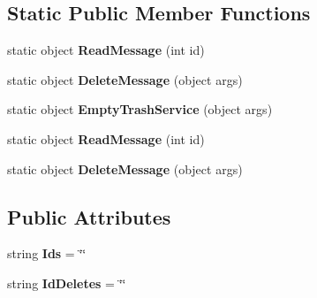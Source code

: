 \subsection*{Static Public Member Functions}
\begin{DoxyCompactItemize}
\item 
\hypertarget{classusertrash_a00e6164755aaf3a6714c8a7c9334a9fc}{static object {\bfseries Read\-Message} (int id)}\label{classusertrash_a00e6164755aaf3a6714c8a7c9334a9fc}

\item 
\hypertarget{classusertrash_a59f65d884c2452d7e72dea81f84ef089}{static object {\bfseries Delete\-Message} (object args)}\label{classusertrash_a59f65d884c2452d7e72dea81f84ef089}

\item 
\hypertarget{classusertrash_a010968e5218d0b8baf285c406c45ac39}{static object {\bfseries Empty\-Trash\-Service} (object args)}\label{classusertrash_a010968e5218d0b8baf285c406c45ac39}

\item 
\hypertarget{classusertrash_a00e6164755aaf3a6714c8a7c9334a9fc}{static object {\bfseries Read\-Message} (int id)}\label{classusertrash_a00e6164755aaf3a6714c8a7c9334a9fc}

\item 
\hypertarget{classusertrash_a59f65d884c2452d7e72dea81f84ef089}{static object {\bfseries Delete\-Message} (object args)}\label{classusertrash_a59f65d884c2452d7e72dea81f84ef089}

\end{DoxyCompactItemize}
\subsection*{Public Attributes}
\begin{DoxyCompactItemize}
\item 
\hypertarget{classusertrash_a13de31bd6fd99fe7e56a08fcf0952ffa}{string {\bfseries Ids} = \char`\"{}\char`\"{}}\label{classusertrash_a13de31bd6fd99fe7e56a08fcf0952ffa}

\item 
\hypertarget{classusertrash_a09c37b637169bb972f29fa5676bc2c56}{string {\bfseries Id\-Deletes} = \char`\"{}\char`\"{}}\label{classusertrash_a09c37b637169bb972f29fa5676bc2c56}

\end{DoxyCompactItemize}
